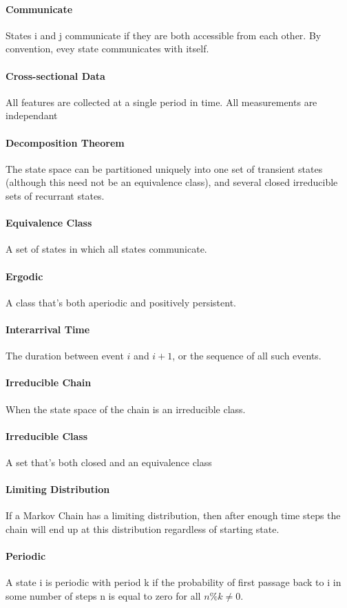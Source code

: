 \documentclass[12pt]{article}
\begin{document}
    \paragraph{Communicate} States i and j communicate if they are both accessible from each other. By convention, evey state communicates with itself.
    \paragraph{Cross-sectional Data} All features are collected at a single period in time. All measurements are independant
    \paragraph{Decomposition Theorem} The state space can be partitioned uniquely into one set of transient states (although this need not be an equivalence class), and several closed irreducible sets of recurrant states.
    \paragraph{Equivalence Class} A set of states in which all states communicate.
    \paragraph{Ergodic} A class that's both aperiodic and positively persistent.
    \paragraph{Interarrival Time} The duration between event \(i\) and \(i+1\), or the sequence of all such events.
    \paragraph{Irreducible Chain} When the state space of the chain is an irreducible class.
    \paragraph{Irreducible Class} A set that's both closed and an equivalence class
    \paragraph{Limiting Distribution} If a Markov Chain has a limiting distribution, then after enough time steps the chain will end up at this distribution regardless of starting state.
    \paragraph{Periodic} A state i is periodic with period k if the probability of first passage back to i in some number of steps n is equal to zero for all \(n \% k \ne 0\).
\end{document}
